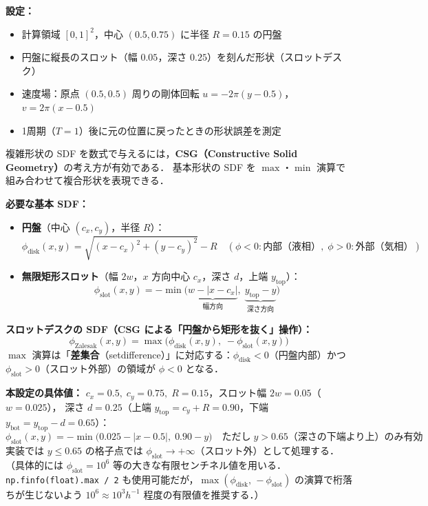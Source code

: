 \textbf{設定：}
\begin{itemize}
  \item 計算領域 $[0,1]^2$，中心 $(0.5, 0.75)$ に半径 $R=0.15$ の円盤
  \item 円盤に縦長のスロット（幅 $0.05$，深さ $0.25$）を刻んだ形状（スロットデスク）
  \item 速度場：原点 $(0.5, 0.5)$ 周りの剛体回転 $u = -2\pi(y-0.5)$，$v = 2\pi(x-0.5)$
  \item 1周期（$T = 1$）後に元の位置に戻ったときの形状誤差を測定
\end{itemize}

\begin{tcolorbox}[algbox, title={スロットデスクの符号付き距離関数（SDF）の解析的構築}]
複雑形状の SDF を数式で与えるには，\textbf{CSG（Constructive Solid Geometry）}の考え方が有効である．
基本形状の SDF を $\max$・$\min$ 演算で組み合わせて複合形状を表現できる．

\textbf{必要な基本 SDF：}
\begin{itemize}
  \item \textbf{円盤}（中心 $(c_x, c_y)$，半径 $R$）：
  \[
    \phi_{\text{disk}}(x,y) = \sqrt{(x-c_x)^2 + (y-c_y)^2} - R
    \quad (\phi < 0: \text{内部（液相）},\;\phi > 0: \text{外部（気相）})
  \]
  \item \textbf{無限矩形スロット}（幅 $2w$，$x$ 方向中心 $c_x$，深さ $d$，上端 $y_{\mathrm{top}}$）：
  \[
    \phi_{\text{slot}}(x,y) = -\min\!\bigl(\underbrace{w - |x - c_x|}_{\text{幅方向}},\;
                                      \underbrace{y_{\mathrm{top}} - y}_{\text{深さ方向}}\bigr)
  \]
\end{itemize}

\textbf{スロットデスクの SDF（CSG による「円盤から矩形を抜く」操作）：}
\[
  \phi_{\text{Zalesak}}(x,y) = \max\!\bigl(\phi_{\text{disk}}(x,y),\; -\phi_{\text{slot}}(x,y)\bigr)
\]
$\max$ 演算は「\textbf{差集合}（setdifference）」に対応する：$\phi_{\text{disk}} < 0$（円盤内部）かつ $\phi_{\text{slot}} > 0$（スロット外部）の領域が $\phi < 0$ となる．

\textbf{本設定の具体値：}
$c_x = 0.5,\; c_y = 0.75,\; R = 0.15$，スロット幅 $2w = 0.05$（$w = 0.025$），
深さ $d = 0.25$（上端 $y_{\mathrm{top}} = c_y + R = 0.90$，下端 $y_{\mathrm{bot}} = y_{\mathrm{top}} - d = 0.65$）：
\[
  \phi_{\text{slot}}(x,y) = -\min\!\bigl(0.025 - |x - 0.5|,\; 0.90 - y\bigr)
  \quad \text{ただし}\; y > 0.65 \text{（深さの下端より上）のみ有効}
\]
実装では $y \le 0.65$ の格子点では $\phi_{\text{slot}} \to +\infty$（スロット外）として処理する．
（具体的には $\phi_{\text{slot}} = 10^6$ 等の大きな有限センチネル値を用いる．
\texttt{np.finfo(float).max / 2} も使用可能だが，$\max(\phi_{\text{disk}},\,-\phi_{\text{slot}})$
の演算で桁落ちが生じないよう $10^6 \approx 10^3 h^{-1}$ 程度の有限値を推奨する．）
\end{tcolorbox}

